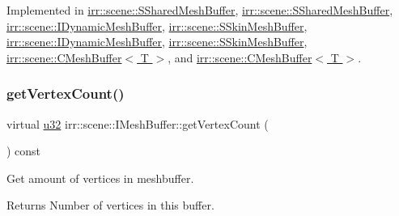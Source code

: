 Implemented in \hyperlink{structirr_1_1scene_1_1SSharedMeshBuffer_aea6a55293929329800d6299f86b65841}{irr\+::scene\+::\+S\+Shared\+Mesh\+Buffer}, \hyperlink{structirr_1_1scene_1_1SSharedMeshBuffer_aea6a55293929329800d6299f86b65841}{irr\+::scene\+::\+S\+Shared\+Mesh\+Buffer}, \hyperlink{classirr_1_1scene_1_1IDynamicMeshBuffer_a3be83e4819e9f79a3d9b264eb8bf4cfc}{irr\+::scene\+::\+I\+Dynamic\+Mesh\+Buffer}, \hyperlink{structirr_1_1scene_1_1SSkinMeshBuffer_a0ba6d4da9bbb92c5aa9c7c70225d3eb6}{irr\+::scene\+::\+S\+Skin\+Mesh\+Buffer}, \hyperlink{classirr_1_1scene_1_1IDynamicMeshBuffer_a3be83e4819e9f79a3d9b264eb8bf4cfc}{irr\+::scene\+::\+I\+Dynamic\+Mesh\+Buffer}, \hyperlink{structirr_1_1scene_1_1SSkinMeshBuffer_a0ba6d4da9bbb92c5aa9c7c70225d3eb6}{irr\+::scene\+::\+S\+Skin\+Mesh\+Buffer}, \hyperlink{classirr_1_1scene_1_1CMeshBuffer_a3e971800b0fc1a67134f839309589e43}{irr\+::scene\+::\+C\+Mesh\+Buffer$<$ T $>$}, and \hyperlink{classirr_1_1scene_1_1CMeshBuffer_a3e971800b0fc1a67134f839309589e43}{irr\+::scene\+::\+C\+Mesh\+Buffer$<$ T $>$}.

\mbox{\label{classirr_1_1scene_1_1IMeshBuffer_a77ab285c8c886af8ddeb0371db7bde96}} 
\subsubsection{\texorpdfstring{get\+Vertex\+Count()}{getVertexCount()}\hspace{0.1cm}{\footnotesize\ttfamily [1/2]}}
{\footnotesize\ttfamily virtual \hyperlink{namespaceirr_a0416a53257075833e7002efd0a18e804}{u32} irr\+::scene\+::\+I\+Mesh\+Buffer\+::get\+Vertex\+Count (\begin{DoxyParamCaption}{ }\end{DoxyParamCaption}) const\hspace{0.3cm}{\ttfamily [pure virtual]}}



Get amount of vertices in meshbuffer. 

\begin{DoxyReturn}{Returns}
Number of vertices in this buffer. 
\end{DoxyReturn}


